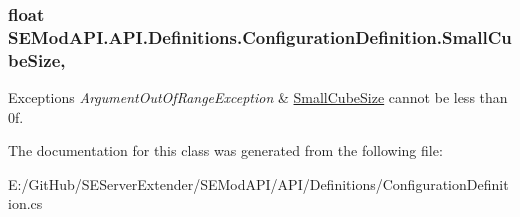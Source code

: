 \subsubsection[{Small\+Cube\+Size}]{\setlength{\rightskip}{0pt plus 5cm}float S\+E\+Mod\+A\+P\+I.\+A\+P\+I.\+Definitions.\+Configuration\+Definition.\+Small\+Cube\+Size\hspace{0.3cm}{\ttfamily [get]}, {\ttfamily [set]}}\label{class_s_e_mod_a_p_i_1_1_a_p_i_1_1_definitions_1_1_configuration_definition_aceadd5f38a6297da375f29a3b35865e6}

\begin{DoxyExceptions}{Exceptions}
{\em Argument\+Out\+Of\+Range\+Exception} & \hyperlink{class_s_e_mod_a_p_i_1_1_a_p_i_1_1_definitions_1_1_configuration_definition_aceadd5f38a6297da375f29a3b35865e6}{Small\+Cube\+Size} cannot be less than 0f. \\
\hline
\end{DoxyExceptions}


The documentation for this class was generated from the following file\+:\begin{DoxyCompactItemize}
\item 
E\+:/\+Git\+Hub/\+S\+E\+Server\+Extender/\+S\+E\+Mod\+A\+P\+I/\+A\+P\+I/\+Definitions/Configuration\+Definition.\+cs\end{DoxyCompactItemize}
